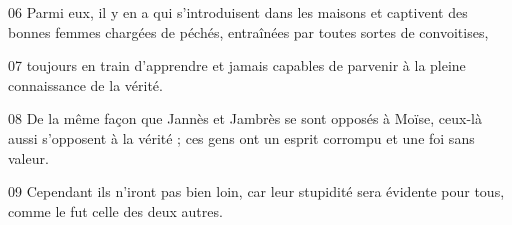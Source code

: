 
06 Parmi eux, il y en a qui s’introduisent dans les maisons et captivent des bonnes femmes chargées de péchés, entraînées par toutes sortes de convoitises,

07 toujours en train d’apprendre et jamais capables de parvenir à la pleine connaissance de la vérité.

08 De la même façon que Jannès et Jambrès se sont opposés à Moïse, ceux-là aussi s’opposent à la vérité ; ces gens ont un esprit corrompu et une foi sans valeur.

09 Cependant ils n’iront pas bien loin, car leur stupidité sera évidente pour tous, comme le fut celle des deux autres.

